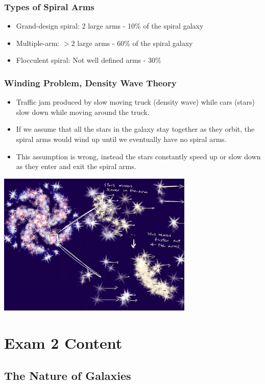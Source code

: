 \documentclass{book}
\begin{document}
\subsection{Types of Spiral Arms}
\begin{itemize}
    \item Grand-design spiral: 2 large arms - 10\% of the spiral galaxy
    \item Multiple-arm: $>2$ large arms - 60\% of the spiral galaxy
    \item Flocculent spiral: Not well defined arms - 30\%
\end{itemize}
\subsection{Winding Problem, Density Wave Theory}
\begin{itemize}
    \item Traffic jam produced by slow moving truck (density wave) while cars (stars) slow down while moving around the truck.
    \item If we assume that all the stars in the galaxy stay together as they orbit, the spiral arms would wind up until we eventually have no spiral arms.
    \item This assumption is wrong, instead the stars constantly speed up or slow down as they enter and exit the spiral arms.
\end{itemize}
\begin{center}
    \includegraphics[width =0.7\textwidth]{images/winding.jpg}
\end{center}
\chapter{Exam 2 Content}
\section{The Nature of Galaxies}
\end{document}
